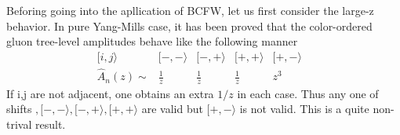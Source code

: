 \documentclass[12pt]{article}
\numberwithin{equation}{section}
\begin{document}
Beforing going into the apllication of BCFW, let us first consider the large-z behavior. 
In pure Yang-Mills case, it has been proved that the color-ordered gluon tree-level amplitudes behave like the following manner\cite{Arkani-Hamed:2001kyx}
$$ 
\begin{array}{cccccc}
   [i,j\rangle & [-,-\rangle & [-,+\rangle & [+,+\rangle & [+,-\rangle &
   \\[2mm]
   \hat{A}_n(z) \sim 
   &  \frac{1}{z} &  \frac{1}{z} &  \frac{1}{z} & z^3
   \end{array}
$$
If i,j are not adjacent, one obtains an extra $1/z$ in each case. Thus any one of shifts $,[-,-\rangle,[-,+\rangle,[+,+\rangle$ are valid
but $[+,-\rangle$ is not valid. This is a quite non-trival result.





\newpage


\end{document}
